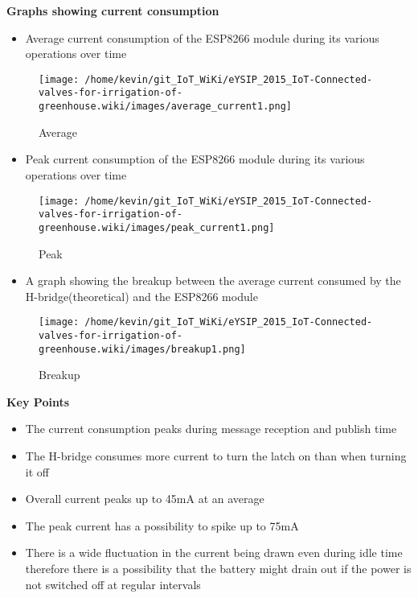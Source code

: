 \documentclass[16pt]{article}
\begin{document}
{\Large{\textbf{Graphs showing current
consumption}}}

\begin{itemize}

\item
  Average current consumption of the ESP8266 module during its various
  operations over time
\end{itemize}

\begin{figure}

\texttt{[image: /home/kevin/git\_IoT\_WiKi/eYSIP\_2015\_IoT-Connected-valves-for-irrigation-of-greenhouse.wiki/images/average\_current1.png]}
\caption{Average}
\end{figure}

\begin{itemize}
\item
  Peak current consumption of the ESP8266 module during its various
  operations over time
\end{itemize}

\begin{figure}

\texttt{[image: /home/kevin/git\_IoT\_WiKi/eYSIP\_2015\_IoT-Connected-valves-for-irrigation-of-greenhouse.wiki/images/peak\_current1.png]}
\caption{Peak}
\end{figure}

\begin{itemize}
\item
  A graph showing the breakup between the average current consumed by
  the H-bridge(theoretical) and the ESP8266 module
\end{itemize}

\begin{figure}

\texttt{[image: /home/kevin/git\_IoT\_WiKi/eYSIP\_2015\_IoT-Connected-valves-for-irrigation-of-greenhouse.wiki/images/breakup1.png]}
\caption{Breakup}
\end{figure}

\textbf{Key Points}

\begin{itemize}

\item
  The current consumption peaks during message reception and publish
  time
\item
  The H-bridge consumes more current to turn the latch on than when
  turning it off
\item
  Overall current peaks up to 45mA at an average
\item
  The peak current has a possibility to spike up to 75mA
\item
  There is a wide fluctuation in the current being drawn even during
  idle time therefore there is a possibility that the battery might
  drain out if the power is not switched off at regular intervals
\end{itemize}
\end{document}
